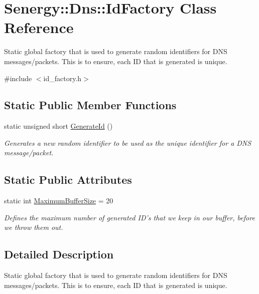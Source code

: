 \hypertarget{class_senergy_1_1_dns_1_1_id_factory}{\section{Senergy\-:\-:Dns\-:\-:Id\-Factory Class Reference}
\label{class_senergy_1_1_dns_1_1_id_factory}
}


Static global factory that is used to generate random identifiers for D\-N\-S messages/packets. This is to ensure, each I\-D that is generated is unique.  




{\ttfamily \#include $<$id\-\_\-factory.\-h$>$}

\subsection*{Static Public Member Functions}
\begin{DoxyCompactItemize}
\item 
static unsigned short \hyperlink{class_senergy_1_1_dns_1_1_id_factory_aac705471a570313494ca2661a5888b3d}{Generate\-Id} ()
\begin{DoxyCompactList}\small\item\em Generates a new random identifier to be used as the unique identifier for a D\-N\-S message/packet. \end{DoxyCompactList}\end{DoxyCompactItemize}
\subsection*{Static Public Attributes}
\begin{DoxyCompactItemize}
\item 
static int \hyperlink{class_senergy_1_1_dns_1_1_id_factory_ae3169f3201faed02512868b1f128bbcb}{Maximum\-Buffer\-Size} = 20
\begin{DoxyCompactList}\small\item\em Defines the maximum number of generated I\-D's that we keep in our buffer, before we throw them out. \end{DoxyCompactList}\end{DoxyCompactItemize}


\subsection{Detailed Description}
Static global factory that is used to generate random identifiers for D\-N\-S messages/packets. This is to ensure, each I\-D that is generated is unique. 

